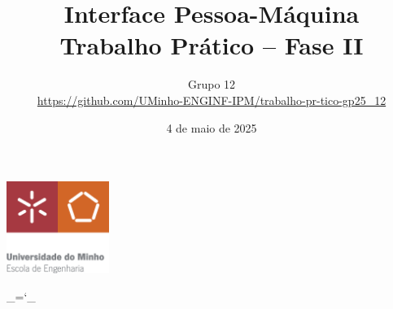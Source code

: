 \documentclass[12pt, a4paper]{article}
\title{\textbf{Interface Pessoa-Máquina \\ \large Trabalho Prático -- Fase II}}
\date{4 de maio de 2025}
\author{Grupo 12 \\
    \url{https://github.com/UMinho-ENGINF-IPM/trabalho-pr-tico-gp25_12}}
\begin{document}
\begin{center}
    \includegraphics[width=0.25\textwidth]{res/cover/school-of-engineering.eps}
\end{center}

{\let\newpage\relax\maketitle}
\maketitle
\thispagestyle{empty}

\chardef\_=`_
\onehalfspacing
\setlength{\parskip}{\baselineskip}
\setlength{\intextsep}{2\baselineskip}
\setlength\belowcaptionskip{-\baselineskip}
\setlength{\parindent}{0pt}
\def\arraystretch{1.5}
\end{document}
